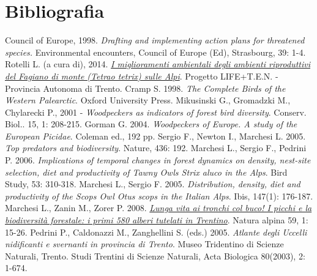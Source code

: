 \documentclass[10pt,twoside,openany,x11names,svgnames,italian,a5paper,dvipsnames,table]{memoir}
\newcommand\chapterillustration{}
\begin{document}
\chapter{Bibliografia}
\renewcommand\chapterillustration{}
\renewcommand*{\bibname}{}
\begingroup
\renewcommand{\addcontentsline}[3]{}%
\renewcommand{\section}[2]{}%
\begin{thebibliography}{99}
\footnotesize
{} Council of Europe, 1998. \emph{Drafting and implementing action plans for threatened species.} Environmental encounters, Council of Europe (Ed), Strasbourg, 39: 1-4.
 Rotelli L. (a cura di), 2014. \href{http://tinyurl.com/palyg5s}{\emph{I miglioramenti ambientali degli ambienti riproduttivi del Fagiano di monte (\emph{Tetrao tetrix}) sulle Alpi}}. Progetto LIFE+T.E.N. - Provincia Autonoma di Trento.
Cramp S. 1998. \emph{The Complete Birds of the Western Palearctic}. Oxford University Press.
Mikusinski G., Gromadzki M., Chylarecki P., 2001 - \emph{Woodpeckers as indicators of forest bird diversity}. Conserv. Biol.. 15, 1: 208-215.
Gorman G. 2004. \emph{Woodpeckers of Europe. A study of the European \emph{Picidae}}. Coleman ed., 192 pp.
Sergio F., Newton I., Marchesi L. 2005. \emph{Top predators and biodiversity}. Nature, 436: 192.
Marchesi L., Sergio F., Pedrini P. 2006. \emph{Implications of temporal changes in forest dynamics on density, nest-site selection, diet and productivity of Tawny Owls \emph{Strix aluco} in the Alps}. Bird Study, 53: 310-318.
Marchesi L., Sergio F. 2005. \emph{Distribution, density, diet and productivity of the Scops Owl \emph{Otus scops} in the Italian Alps}. Ibis, 147(1): 176-187.
Marchesi L., Zanin M., Zorer P. 2008. \href{http://www2.muse.it/pubblicazioni/8/59a/MUSEO_nat_02.pdf}{\emph{Lunga vita ai tronchi col buco! I picchi e la biodiversità forestale: i primi 580 alberi tutelati in Trentino}}. Natura alpina 59, 1: 15-26.
Pedrini P., Caldonazzi M., Zanghellini S. (eds.) 2005. \emph{Atlante degli Uccelli nidificanti e svernanti in provincia di Trento}. Museo Tridentino di Scienze Naturali, Trento. Studi Trentini di Scienze Naturali, Acta Biologica 80(2003), 2: 1-674.

\end{thebibliography}
\end{document}
